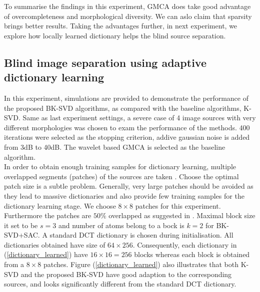 
To summarise the findings in this experiment, GMCA does take good advantage of overcompleteness and morphological diversity. We can aslo claim that sparsity brings better results. Taking the advantages further, in next experiment, we explore how locally learned dictionary helps the blind source separation.\\

\subsection{Blind image separation using adaptive dictionary learning}

In this experiment, simulations are provided to demonstrate the performance of the proposed BK-SVD algorithms, as compared with the baseline algorithms, K-SVD. Same as last experiment settings, a severe case of 4 image sources with very different morphologies was chosen to exam the performance of the methods. 400 iterations were selected as the stopping criterion, addive gaussian noise is added from 3dB to 40dB. The wavelet based GMCA is selected as the baseline algorithm.\\

In order to obtain enough training samples for dictionary learning, multiple overlapped segments (patches) of the sources are taken \cite{VAbolghasemi2012}. Choose the optimal patch size is a subtle problem. Generally, very large patches should be avoided as they lead to massive dictionaries and also provide few training samples for the dictionary learning stage. We choose $8\times 8$ patches for this experiment. Furthermore the patches are $50\%$ overlapped as suggested in \cite{VAbolghasemi2012}. Maximal block size it set to be $s= 3$ and number of atoms belong to a bock is $k=2$ for BK-SVD+SAC. A standard DCT dictionary is chosen during initialisation. All dictionaries obtained have size of $64\times 256$. Consequently, each dictionary in (\ref{dictionary_learned}) have $16 \times 16 = 256$ blocks whereas each block is obtained from a $8\times 8$ patches. Figure (\ref{dictionary_learned}) also illustrates that both K-SVD and the proposed BK-SVD have good adaption to the corresponding sources, and looks significantly different from the standard DCT dictionary.\\

